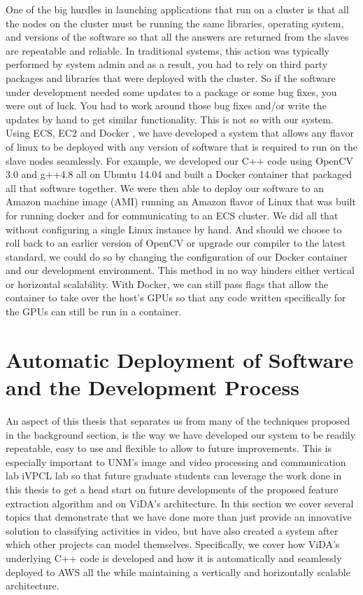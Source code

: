 One of the big hurdles in launching applications that run on a cluster is that
all the nodes on the cluster must be running the same libraries, operating
system,  and versions of the software so that all the answers are returned from
the slaves are repeatable and reliable. In traditional systems, this action was
typically performed by system admin and as a result, you had to rely on third
party packages and libraries that were deployed with the cluster. So if the
software under development needed some updates to a package or some bug fixes,
you were out of luck. You had  to work around those bug fixes and/or write the
updates by hand to get similar  functionality. This is not so with our system.
Using ECS, EC2 and Docker \cite{Merkel:2014:DLL:2600239.2600241}, we  have
developed a system that allows any flavor of linux to be deployed with any
version of software that is required to run on the slave nodes seamlessly. For
example, we developed our C++ code using OpenCV 3.0 and g++4.8 all on Ubuntu
14.04 and built a Docker container that packaged all that software together.
We were then able to deploy our software to an Amazon machine image (AMI) running
an Amazon flavor of Linux that was built for running docker and for communicating
to an ECS cluster. We did all that without configuring a single Linux instance
by hand. And should we choose to roll back to an earlier version of OpenCV or
upgrade our compiler to the latest standard, we could do so by changing the
configuration of our Docker container and our development environment. This
method in no way hinders either vertical or horizontal scalability. With Docker,
we can still pass flags that allow the container to take over the host's GPUs
so that any code written specifically for the GPUs can still be run in a container.


\section{\label{section:auto_deployment}Automatic Deployment of Software and
the Development Process}
An aspect of this thesis that separates us from many of the techniques proposed
in the background section, is the way we have developed our system to be readily
repeatable, easy to use and flexible to allow to future improvements. This is
especially important to UNM's image and video processing and communication lab
iVPCL lab so that future graduate students can leverage the work done in this
thesis to get a head start on future developments of the proposed feature
extraction algorithm and on ViDA's architecture. In this section we cover
several topics that demonstrate that we have done more than just provide an
innovative solution to classifying activities in video, but have also created a
system after which other projects can model themselves. Specifically, we cover
how ViDA's underlying C++ code is developed and how it is automatically and
seamlessly deployed to AWS all the while maintaining a vertically and
horizontally scalable architecture.

